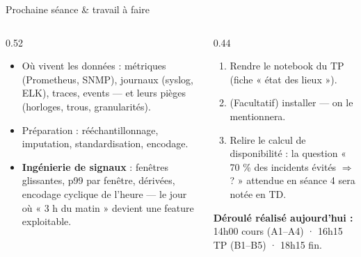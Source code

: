 \begin{frame}{Prochaine séance \& travail à faire}
\footnotesize%
\begin{columns}[t]
\begin{column}{0.52\textwidth}
\begin{ebox}
\begin{itemize}
\item Où vivent les données : métriques (Prometheus, SNMP), journaux (syslog, ELK),
traces, events --- et leurs pièges (horloges, trous, granularités).
\item Préparation : rééchantillonnage, imputation, standardisation, encodage.
\item \textbf{Ingénierie de signaux} : fenêtres glissantes, p99 par fenêtre,
dérivées, encodage cyclique de l'heure --- le jour où « 3 h du matin »
devient une feature exploitable.
\end{itemize}
\end{ebox}
\end{column}
\begin{column}{0.44\textwidth}
\begin{abox}
\begin{enumerate}
\item Rendre le notebook du TP (fiche « état des lieux »).
\item (Facultatif) installer  --- on le mentionnera.
\item Relire le calcul de disponibilité : la question « 70 \% des incidents
évités $\Rightarrow$ ? » attendue en séance 4 sera notée en TD.
\end{enumerate}
\end{abox}
\begin{center}\small
\textbf{Déroulé réalisé aujourd'hui :} 14h00 cours (A1--A4) · 16h15 TP (B1--B5) · 18h15 fin.
\end{center}
\end{column}
\end{columns}
\end{frame}
